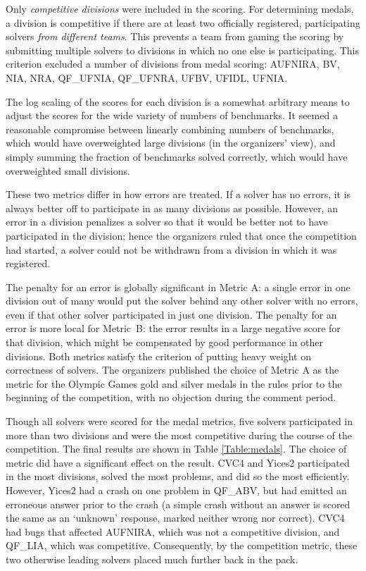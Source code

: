 \documentclass[twoside,11pt]{article}
\begin{document}
Only \emph{competitive divisions} were included in the scoring. For determining medals, a division is competitive if there are at least two officially registered, participating solvers \emph{from different teams}. This prevents a team from gaming the scoring by submitting multiple solvers to divisions in which no one else is participating. This criterion excluded a number of divisions from medal scoring: AUFNIRA, BV, NIA, NRA, QF\_UFNIA, QF\_UFNRA, UFBV, UFIDL, UFNIA.

The log scaling of the scores for each division is a somewhat arbitrary means to adjust the scores for the wide variety of numbers of benchmarks. It seemed a reasonable compromise between linearly combining numbers of benchmarks, which would have overweighted large divisions (in the organizers' view), and simply summing the fraction of benchmarks solved correctly, which would have overweighted small divisions.

These two metrics differ in how errors are treated. If a solver has no errors, it is always better off to participate in as many divisions as possible. However, an error in a division penalizes a solver so that it would be better not to have participated in the division; hence the organizers ruled that once the competition had started, a solver could not be withdrawn from a division in which it was registered.

The penalty for an error is globally significant in Metric A: a single error in one division out of many would put the solver behind any other solver with no errors, even if that other solver participated in just one division. The penalty for an error is more local for Metric~B: the error results in a large negative score for that division, which might be compensated by good performance in other divisions. Both metrics satisfy the criterion of putting heavy weight on correctness of solvers.
The organizers published the choice of Metric A as the metric for the Olympic Games gold and silver medals in the rules prior to the beginning of the competition, with no objection during the comment period.

Though all solvers were scored for the medal metrics, five solvers participated in more than two divisions and were the most competitive during the course of the competition. The final results are shown in Table \ref{Table:medals}. The choice of metric did have a significant effect on the result. CVC4 and Yices2 participated in the most divisions, solved the most problems, and did so the most efficiently. However, Yices2 had a crash on one problem in QF\_ABV, but had emitted an erroneous answer prior to the crash (a simple crash without an answer is scored the same as an `unknown' response, marked neither wrong nor correct). CVC4 had bugs that affected AUFNIRA, which was not a competitive division, and QF\_LIA,
which was competitive. Consequently, by the competition metric, these two otherwise leading solvers placed much further back in the pack.
\end{document}
